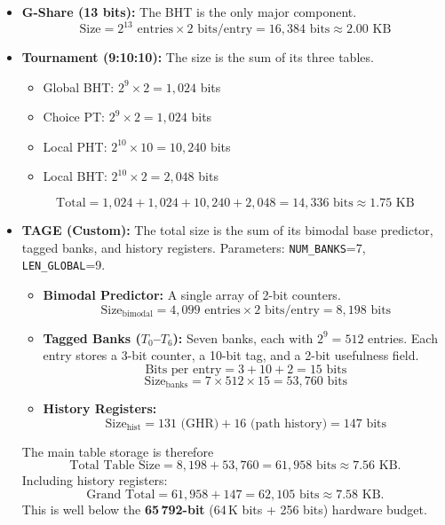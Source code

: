 \documentclass[sigconf, screen]{acmart}
\begin{document}
\begin{itemize}
    \item \textbf{G-Share (13 bits):} The BHT is the only major component.
    $$ \text{Size} = 2^{13} \text{ entries} \times 2 \text{ bits/entry} = 16{,}384 \text{ bits} \approx 2.00 \text{ KB} $$

    \item \textbf{Tournament (9:10:10):} The size is the sum of its three tables.
    \begin{itemize}
        \item Global BHT: $2^9 \times 2 = 1{,}024$ bits
        \item Choice PT: $2^9 \times 2 = 1{,}024$ bits
        \item Local PHT: $2^{10} \times 10 = 10{,}240$ bits
        \item Local BHT: $2^{10} \times 2 = 2{,}048$ bits
    \end{itemize}
    $$ \text{Total} = 1{,}024 + 1{,}024 + 10{,}240 + 2{,}048 = 14{,}336 \text{ bits} \approx 1.75 \text{ KB} $$

    \item \textbf{TAGE (Custom):} The total size is the sum of its bimodal base predictor, tagged banks, and history registers.  
    Parameters: \texttt{NUM\_BANKS}=7, \texttt{LEN\_GLOBAL}=9.
    \begin{itemize}
        \item \textbf{Bimodal Predictor:} A single array of 2-bit counters.  
        $$ \text{Size}_{\text{bimodal}} = 4{,}099 \text{ entries} \times 2 \text{ bits/entry} = 8{,}198 \text{ bits} $$
        \item \textbf{Tagged Banks ($T_0$–$T_6$):} Seven banks, each with $2^{9}=512$ entries.  
        Each entry stores a 3-bit counter, a 10-bit tag, and a 2-bit usefulness field.  
        $$ \text{Bits per entry} = 3 + 10 + 2 = 15 \text{ bits} $$
        $$ \text{Size}_{\text{banks}} = 7 \times 512 \times 15 = 53{,}760 \text{ bits} $$
        \item \textbf{History Registers:}  
        $$ \text{Size}_{\text{hist}} = 131 \text{ (GHR)} + 16 \text{ (path history)} = 147 \text{ bits} $$
    \end{itemize}
    The main table storage is therefore
    $$ \text{Total Table Size} = 8{,}198 + 53{,}760 = 61{,}958 \text{ bits} \approx 7.56 \text{ KB}. $$
    Including history registers:
    $$ \text{Grand Total} = 61{,}958 + 147 = 62{,}105 \text{ bits} \approx 7.58 \text{ KB}. $$
    This is well below the \textbf{65\,792-bit} (64\,K bits + 256 bits) hardware budget.
\end{itemize}
\end{document}
